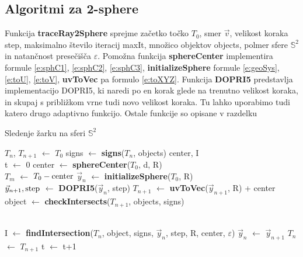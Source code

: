 \documentclass[titlepage]{article}
\begin{document}
\subsection{Algoritmi za 2-sphere}
Funkcija \textbf{traceRay2Sphere} sprejme začetko točko $T_{0}$, smer $\vec{v}$, velikost koraka step, maksimalno število iteracij maxIt, množico objektov objects, polmer sfere $\mathbb{S}^2$ in natančnost presečišča $\varepsilon$. 
Pomožna funkcija \textbf{sphereCenter} implementira formule \eqref{e:sphC1}, \eqref{e:sphC2}, \eqref{e:sphC3}, \textbf{initializeSphere} formule \eqref{e:geoSys}, \eqref{e:toU}, \eqref{e:toV}, \textbf{uvToVec} pa formulo \eqref{e:toXYZ}. Funkcija \textbf{DOPRI5} predstavlja implementacijo DOPRI5, ki naredi po en korak glede na trenutno velikost koraka, in skupaj s približkom vrne tudi novo velikost koraka. Tu lahko uporabimo tudi katero drugo adaptivno funkcijo. Ostale funkcije so opisane v
razdelku 
\begin{algorithm}
    \caption{Sledenje žarku na sferi \(\mathbb{S}^{2}\)}
\begin{algorithmic}

    \State $T_{n}$, $T_{n+1}$ $\gets$ $T_{0}$
    \State signs $\gets$ \textbf{signs}($T_{n}$, objects)
    \State center, I
    \\
    \State t $\gets$ 0
    \State {}
      \State center $\gets$ \textbf{sphereCenter}($T_{0}$, d, R)
      \\
      \State $T_{m}$ $\gets$ $T_{0} - \hbox{center}$
      \State $\vec{y}_{n}$ $\gets$ \textbf{initializeSphere}($T_{0}$, R)
    \EndIf
    \\
    \State $\vec{y}_{n+1}, \hbox{step}$ $\gets$ \textbf{DOPRI5}($\vec{y}_{n}$, step)
    \State $T_{n+1}$ $\gets$ \textbf{uvToVec}($\vec{y}_{n+1}$, R) + center
    \\
    \State object $\gets$ \textbf{checkIntersects}($T_{n+1}$, objects, signs)
    \\
    \\

      \State I $\gets$ \textbf{findIntersection}($T_{n}$, object, signs, $\vec{y}_{n}$, step, R, center, $\varepsilon$)
      \State {}
    \Else
      \State $\vec{y}_{n}$ $\gets$ $\vec{y}_{n+1}$
      \State $T_{n}$ $\gets$ $T_{n+1}$
      \State t $\gets$ t+1
    \EndIf
  \EndWhile
\EndFunction
\end{algorithmic}
\end{algorithm}
\end{document}
